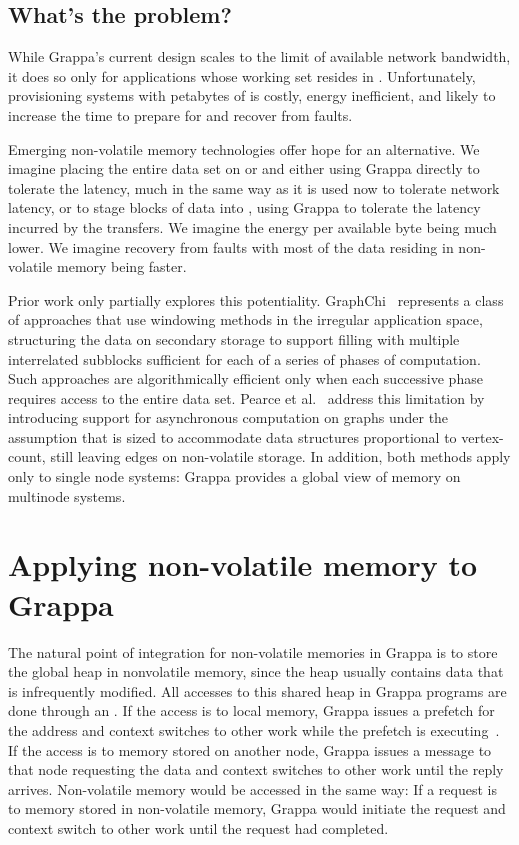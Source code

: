 \subsection{What's the problem?}

While Grappa's current design scales to the limit of available network
bandwidth, it does so only for applications whose working set resides
in \@.  Unfortunately, provisioning systems with petabytes of  is
costly, energy inefficient, and likely to increase the time to prepare
for and recover from faults.

Emerging non-volatile memory technologies offer hope for an
alternative.  We imagine placing the entire data set on  or  and
either using Grappa directly to tolerate the latency, much in the same
way as it is used now to tolerate network latency, or to stage blocks
of data into , using Grappa to tolerate the latency incurred by the
transfers.  We imagine the energy per available byte being much lower.
We imagine recovery from faults with most of the data residing in
non-volatile memory being faster.

Prior work only partially explores this potentiality. GraphChi~\cite{graphchi:osdi12}
represents a class of approaches that use windowing methods in the
irregular application space, structuring the data on secondary storage
to support filling  with multiple interrelated subblocks sufficient
for each of a series of phases of computation.  Such approaches are
algorithmically efficient only when each successive phase requires
access to the entire data set.  Pearce et al.~\cite{magt:2010} address this limitation by
introducing support for asynchronous computation on graphs under the
assumption that  is sized to accommodate data structures
proportional to vertex-count, still leaving edges on non-volatile
storage.  In addition, both methods apply only to single node systems:
Grappa provides a global view of memory on multinode systems.

\section{Applying non-volatile memory to Grappa}
The natural point of integration for non-volatile memories in Grappa
is to store the global heap in nonvolatile memory, since the heap
usually contains data that is infrequently modified. All accesses to
this shared heap in Grappa programs are done through an \@. If the
access is to local memory, Grappa issues a prefetch for the address
and context switches to other work while the prefetch is executing~\cite{Nelson:hotpar2011}. If
the access is to memory stored on another node, Grappa issues a
message to that node requesting the data and context switches to other
work until the reply arrives. Non-volatile memory would be accessed in
the same way: If a request is to memory stored in non-volatile memory,
Grappa would initiate the request and context switch to other work
until the request had completed.

